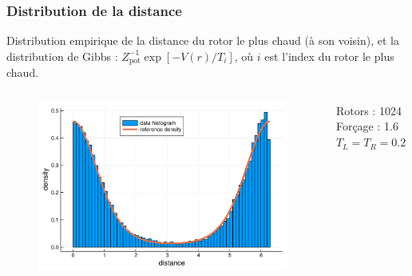 \begin{frame}

    \frametitle{Distribution de la distance}

    Distribution empirique de la distance du rotor le plus chaud
    (à son voisin), et la distribution de Gibbs :
    $Z_\text{pot}^{-1} \exp[-V(r) / T_i]$,
    où $i$ est l'index du rotor le plus chaud.

    \begin{columns}

        \begin{column}{0.8\textwidth}
            \begin{figure}
                \includegraphics[scale=0.4]{plots/gibbs_distance.pdf}
            \end{figure}
        \end{column}

        \begin{column}{0.2\textwidth}
            \scriptsize
            Rotors : 1024
            Forçage : 1.6
            $T_L = T_R = 0.2$
        \end{column}

    \end{columns}

\end{frame}

